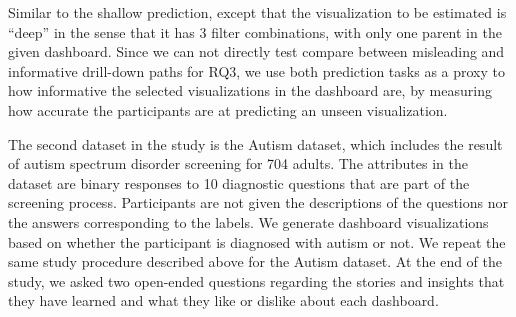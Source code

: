  Similar to the shallow prediction, except that the visualization to be estimated is ``deep'' in the sense that it has 3 filter combinations, with only one parent in the given dashboard. Since we can not directly test compare between misleading and informative drill-down paths for RQ3, we use both prediction tasks as a proxy to how informative the selected visualizations in the dashboard are, by measuring how accurate the participants are at predicting an unseen visualization.

\par The second dataset in the study is the Autism dataset\cite{autism}, which includes the result of autism spectrum disorder screening for 704 adults. The attributes in the dataset are  binary responses to 10 diagnostic questions that are part of the screening process. Participants are not given the descriptions of the questions nor the answers corresponding to the labels. We generate dashboard visualizations based on whether the participant is diagnosed with autism or not. We repeat the same study procedure described above for the Autism dataset. At the end of the study, we asked two open-ended questions regarding the stories and insights that they have learned and what they like or dislike about each dashboard.
